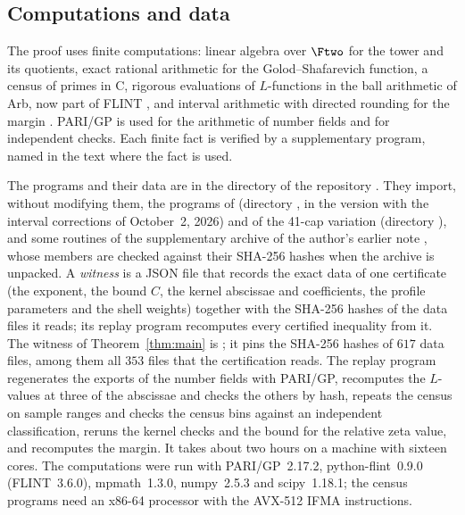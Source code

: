 \subsection{Computations and data}\label{intro:code}
The proof uses finite computations: linear algebra over $\Ftwo$ for the
tower and its quotients, exact rational arithmetic for the
Golod--Shafarevich function, a census of primes in C, rigorous
evaluations of $L$-functions in the ball arithmetic of Arb, now part of
FLINT \cite{Johansson2017,FLINT}, and interval arithmetic with directed
rounding for the margin \cite{Mpmath}. PARI/GP \cite{PARI} is used for
the arithmetic of number fields and for independent checks. Each finite
fact is verified by a supplementary program, named in the text where the
fact is used.

The programs and their data are in the directory
 of the repository
\cite{NaslundCode4317}. They import, without modifying them, the programs
of \cite{Naslund04273} (directory , in
the version with the interval corrections of October~2, 2026) and of the
41-cap variation (directory ), and some
routines of the supplementary archive of the author's earlier note
\cite{Naslund0418235}, whose members are checked against their SHA-256
hashes when the archive is unpacked. A \emph{witness} is a JSON file that
records the exact data of one certificate (the exponent, the bound $C$,
the kernel abscissae and coefficients, the profile parameters and the
shell weights) together with the SHA-256 hashes of the data files it
reads; its replay program recomputes every certified inequality from it.
The witness of Theorem~\ref{thm:main} is
; it pins the
SHA-256 hashes of $617$ data files, among them all $353$ files that the
certification reads.
The replay program 
regenerates the exports of the number fields with PARI/GP, recomputes
the $L$-values at three of the abscissae and checks the others by hash,
repeats the census on sample ranges and checks the census bins against
an independent classification, reruns the kernel checks and the bound
for the relative zeta value, and recomputes the margin. It takes about
two hours on a machine with sixteen cores. The computations were run
with PARI/GP~2.17.2, python-flint~0.9.0 (FLINT~3.6.0), mpmath~1.3.0,
numpy~2.5.3 and scipy~1.18.1; the census programs need an x86-64
processor with the AVX-512 IFMA instructions.
